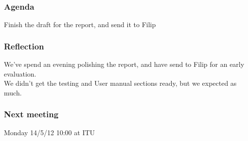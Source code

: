 \subsubsection*{Agenda}
Finish the draft for the report, and send it to Filip

\subsubsection*{Reflection}
We've spend an evening polishing the report, and have send to Filip for an early evaluation. \\
We didn't get the testing and User manual sections ready, but we expected as much.

\subsubsection*{Next meeting}
Monday 14/5/12 10:00 at ITU